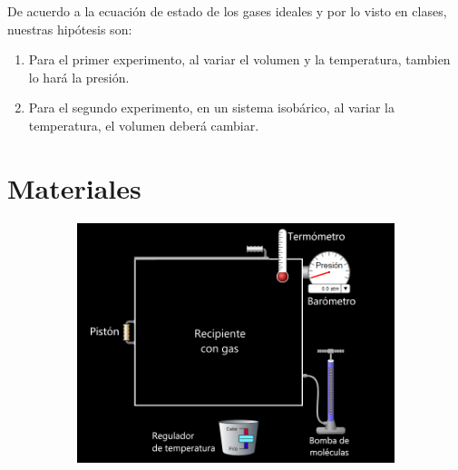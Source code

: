 \documentclass[a4paper, 12p]{article}
\begin{document}
De acuerdo a la ecuación de estado de los gases ideales y por lo visto en clases, nuestras hipótesis son:
\begin{enumerate}
      \item Para el primer experimento, al variar el volumen y la temperatura, tambien lo hará la presión.
      \item Para el segundo experimento, en un sistema isobárico, al variar la temperatura, el volumen deberá cambiar.
\end{enumerate}

\newpage
\section{Materiales}
\begin{figure}[h!]
      \centering
      \includegraphics[width= 12cm, height= 7cm]{imag/Materiales.png}
\end{figure}


\end{document}
